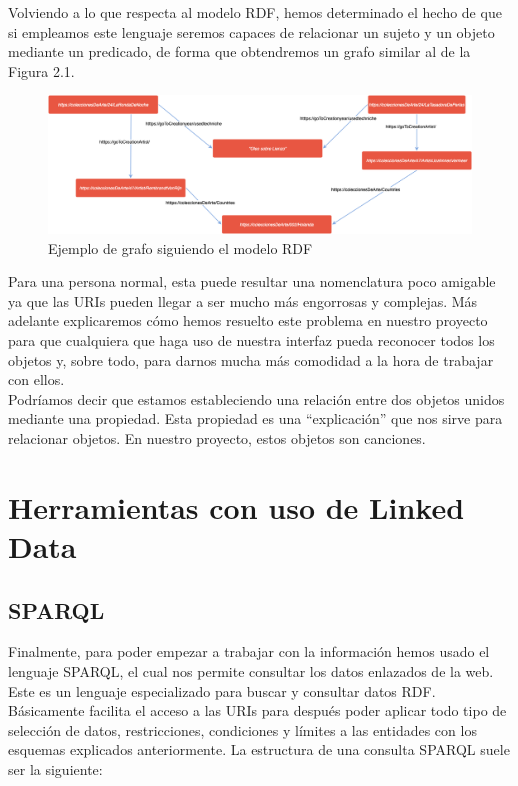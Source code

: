 Volviendo a lo que respecta al modelo RDF, hemos determinado el hecho de que si empleamos este lenguaje seremos capaces de relacionar un sujeto y un objeto mediante un predicado, de forma que obtendremos un grafo similar al de la Figura 2.1.\\

\begin{figure}[h!]
	\centering
	\includegraphics[width = 1\textwidth]{Imagenes/Bitmap/RDFexample.png}
	\caption{Ejemplo de grafo siguiendo el modelo RDF}
	\label{fig:sampleImage}
\end{figure}

Para una persona normal, esta puede resultar una nomenclatura poco amigable ya que las URIs pueden llegar a ser mucho más engorrosas y complejas. Más adelante explicaremos cómo hemos resuelto este problema en nuestro proyecto para que cualquiera que haga uso de nuestra interfaz pueda reconocer todos los objetos y, sobre todo, para darnos mucha más comodidad a la hora de trabajar con ellos.\\

Podríamos decir que estamos estableciendo una relación entre dos objetos unidos mediante una propiedad. Esta propiedad es una ``explicación'' que nos sirve para relacionar objetos. En nuestro proyecto, estos objetos son canciones.\\


\section{Herramientas con uso de Linked Data}


\subsection{SPARQL}

Finalmente, para poder empezar a trabajar con la información hemos usado el lenguaje SPARQL, el cual nos permite consultar los datos enlazados de la web. Este es un lenguaje especializado para buscar y consultar datos RDF. Básicamente facilita el acceso a las URIs para después poder aplicar todo tipo de selección de datos, restricciones, condiciones y límites a las entidades con los esquemas explicados anteriormente. La estructura de una consulta SPARQL suele ser la siguiente:\\

